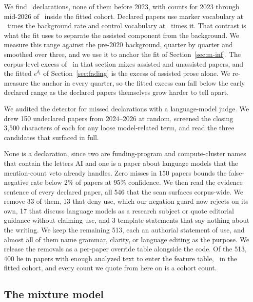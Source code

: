 \documentclass[twocolumn]{aastex631}
\begin{document}
We find \nDeclaredCohort\ declarations, none of them before 2023, with counts for 2023 through mid-2026 of \declCountsByYear\ inside the fitted cohort. Declared papers use marker vocabulary at \anchorRangeMarkers\ times the background rate and control vocabulary at \anchorRangeControls\ times it. That contrast is what the fit uses to separate the assisted component from the background. We measure this range against the pre-2020 background, quarter by quarter and smoothed over three, and we use it to anchor the fit of Section~\ref{sec:m-inf}. The corpus-level excess of \observedExcess\ in that section mixes assisted and unassisted papers, and the fitted $e^{\delta_t}$ of Section~\ref{sec:fading} is the excess of assisted prose alone. We re-measure the anchor in every quarter, so the fitted excess can fall below the early declared range as the declared papers themselves grow harder to tell apart.

We audited the detector for missed declarations with a language-model judge. We drew 150 undeclared papers from 2024--2026 at random, screened the closing 3{,}500 characters of each for any loose model-related term, and read the three candidates that surfaced in full.

None is a declaration, since two are funding-program and compute-cluster names that contain the letters AI and one is a paper about language models that the mention-count veto already handles. Zero misses in 150 papers bounds the false-negative rate below 2\% of papers at 95\% confidence. We then read the evidence sentence of every declared paper, all 546 that the scan surfaces corpus-wide. We remove 33 of them, 13 that deny use, which our negation guard now rejects on its own, 17 that discuss language models as a research subject or quote editorial guidance without claiming use, and 3 template statements that say nothing about the writing. We keep the remaining 513, each an authorial statement of use, and almost all of them name grammar, clarity, or language editing as the purpose. We release the removals as a per-paper override table alongside the code. Of the 513, 400 lie in papers with enough analyzed text to enter the feature table, \nDeclaredCohort\ in the fitted cohort, and every count we quote from here on is a cohort count.

\subsection{The mixture model}\label{sec:m-model}
\end{document}
